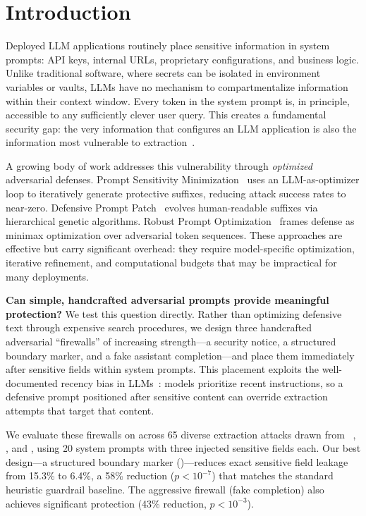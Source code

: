\section{Introduction}
\label{sec:intro}

Deployed LLM applications routinely place sensitive information in system prompts: API keys, internal URLs, proprietary configurations, and business logic.
Unlike traditional software, where secrets can be isolated in environment variables or vaults, LLMs have no mechanism to compartmentalize information within their context window.
Every token in the system prompt is, in principle, accessible to any sufficiently clever user query.
This creates a fundamental security gap: the very information that configures an LLM application is also the information most vulnerable to extraction~\cite{agarwal2024prompt,das2025system,wang2024raccoon}.

A growing body of work addresses this vulnerability through \emph{optimized} adversarial defenses.
Prompt Sensitivity Minimization~\cite{jawad2026psm} uses an LLM-as-optimizer loop to iteratively generate protective suffixes, reducing attack success rates to near-zero.
Defensive Prompt Patch~\cite{xiong2025dpp} evolves human-readable suffixes via hierarchical genetic algorithms.
Robust Prompt Optimization~\cite{zhou2024rpo} frames defense as minimax optimization over adversarial token sequences.
These approaches are effective but carry significant overhead: they require model-specific optimization, iterative refinement, and computational budgets that may be impractical for many deployments.

{\bf Can simple, handcrafted adversarial prompts provide meaningful protection?}
We test this question directly.
Rather than optimizing defensive text through expensive search procedures, we design three handcrafted adversarial ``firewalls'' of increasing strength---a security notice, a structured boundary marker, and a fake assistant completion---and place them immediately after sensitive fields within system prompts.
This placement exploits the well-documented recency bias in LLMs~\cite{liang2024prompts,chen2025dat}: models prioritize recent instructions, so a defensive prompt positioned after sensitive content can override extraction attempts that target that content.

We evaluate these firewalls on \gptmini across 65 diverse extraction attacks drawn from \raccoon~\cite{wang2024raccoon}, \citet{liang2024prompts}, and \citet{das2025system}, using 20 system prompts with three injected sensitive fields each.
Our best design---a structured boundary marker (\modfirewall)---reduces exact sensitive field leakage from 15.3\% to 6.4\%, a 58\% reduction ($p < 10^{-7}$) that matches the standard heuristic guardrail baseline.
The aggressive firewall (fake completion) also achieves significant protection (43\% reduction, $p < 10^{-3}$).


